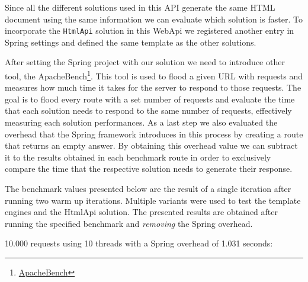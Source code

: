 \noindent
Since all the different solutions used in this \ac{API} generate the same \ac{HTML} document using the same information we can evaluate which solution is faster. To incorporate the \texttt{HtmlApi} solution in this WebApi we registered another entry in Spring settings and defined the same template as the other solutions. 

\noindent
After setting the Spring project with our solution we need to introduce other tool, the ApacheBench\footnote{\href{https://httpd.apache.org/docs/2.4/programs/ab.html}{ApacheBench}}. This tool is used to flood a given \ac{URL} with requests and measures how much time it takes for the server to respond to those requests. The goal is to flood every route with a set number of requests and evaluate the time that each solution needs to respond to the same number of requests, effectively measuring each solution performances. As a last step we also evaluated the overhead that the Spring framework introduces in this process by creating a route that returns an empty answer. By obtaining this overhead value we can subtract it to the results obtained in each benchmark route in order to exclusively compare the time that the respective solution needs to generate their response. 

\noindent
The benchmark values presented below are the result of a single iteration after running two warm up iterations. Multiple variants were used to test the template engines and the HtmlApi solution. The presented results are obtained after running the specified benchmark and \textit{removing} the Spring overhead.

\newpage

10.000 requests using 10 threads with a Spring overhead of 1.031 seconds:

